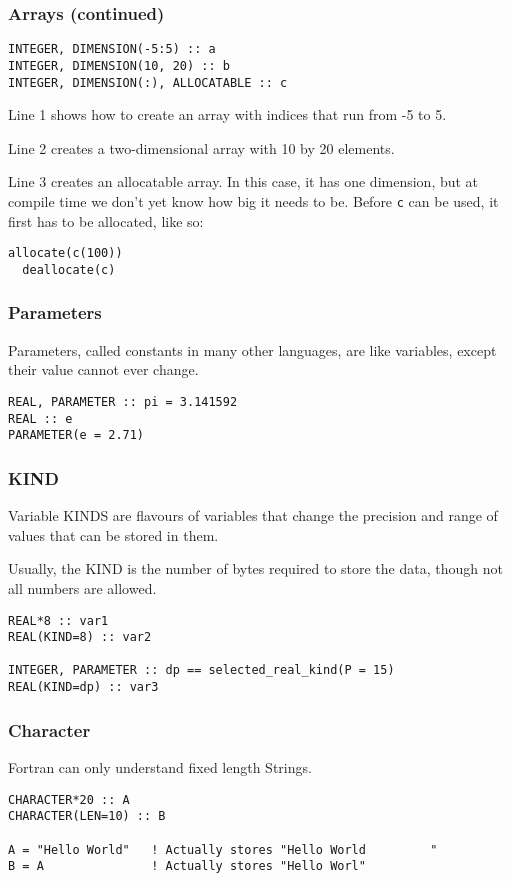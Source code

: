 \begin{frame}[fragile]
  \frametitle{Arrays (continued)}
  \begin{lstlisting}
INTEGER, DIMENSION(-5:5) :: a
INTEGER, DIMENSION(10, 20) :: b
INTEGER, DIMENSION(:), ALLOCATABLE :: c
  \end{lstlisting}

  Line 1 shows how to create an array with indices that run from -5 to 5.

  Line 2 creates a two-dimensional array with 10 by 20 elements.

  Line 3 creates an allocatable array. In this case, it has one dimension, 
  but at compile time we don't yet know how big it needs to be.
  Before \texttt{c} can be used, it first has to be allocated, like so:

  \begin{lstlisting}[numbers=none]
  allocate(c(100))
  deallocate(c)
  \end{lstlisting}

\end{frame}

\begin{frame}[fragile]
  \frametitle{Parameters}
  Parameters, called constants in many other languages, are like variables, except
  their value cannot ever change.

  \begin{lstlisting}
REAL, PARAMETER :: pi = 3.141592
REAL :: e
PARAMETER(e = 2.71)
  \end{lstlisting}
\end{frame}

\begin{frame}[fragile]
  \frametitle{KIND}
  Variable KINDS are flavours of variables that change the precision and range of 
  values that can be stored in them.

  Usually, the KIND is the number of bytes required to store the data, though not all numbers are allowed.

  \begin{lstlisting}
REAL*8 :: var1
REAL(KIND=8) :: var2

INTEGER, PARAMETER :: dp == selected_real_kind(P = 15)
REAL(KIND=dp) :: var3
  \end{lstlisting}
\end{frame}

\begin{frame}[fragile]
  \frametitle{Character}

  Fortran can only understand fixed length Strings. 
  
  \begin{lstlisting}
CHARACTER*20 :: A
CHARACTER(LEN=10) :: B

A = "Hello World"   ! Actually stores "Hello World         "
B = A               ! Actually stores "Hello Worl"
  \end{lstlisting}

\end{frame}

\begin{frame}[fragile]
  \frametitle{}

\end{frame}
